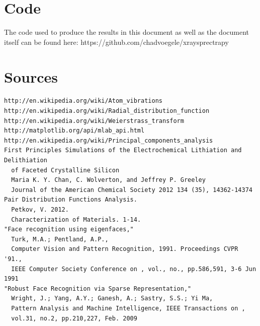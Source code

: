 \documentclass[12pt,letterpaper]{article}
\begin{document}
\section{Code}
The code used to produce the results in this document as well as the document
itself can be found here: https://github.com/chadvoegele/xraysprectrapy

\section{Sources}
\begin{verbatim}
http://en.wikipedia.org/wiki/Atom_vibrations
http://en.wikipedia.org/wiki/Radial_distribution_function
http://en.wikipedia.org/wiki/Weierstrass_transform
http://matplotlib.org/api/mlab_api.html
http://en.wikipedia.org/wiki/Principal_components_analysis
First Principles Simulations of the Electrochemical Lithiation and Delithiation 
  of Faceted Crystalline Silicon
  Maria K. Y. Chan, C. Wolverton, and Jeffrey P. Greeley
  Journal of the American Chemical Society 2012 134 (35), 14362-14374
Pair Distribution Functions Analysis.
  Petkov, V. 2012. 
  Characterization of Materials. 1-14.
"Face recognition using eigenfaces,"
  Turk, M.A.; Pentland, A.P., 
  Computer Vision and Pattern Recognition, 1991. Proceedings CVPR '91., 
  IEEE Computer Society Conference on , vol., no., pp.586,591, 3-6 Jun 1991
"Robust Face Recognition via Sparse Representation," 
  Wright, J.; Yang, A.Y.; Ganesh, A.; Sastry, S.S.; Yi Ma, 
  Pattern Analysis and Machine Intelligence, IEEE Transactions on , 
  vol.31, no.2, pp.210,227, Feb. 2009
\end{verbatim}
\end{document}
